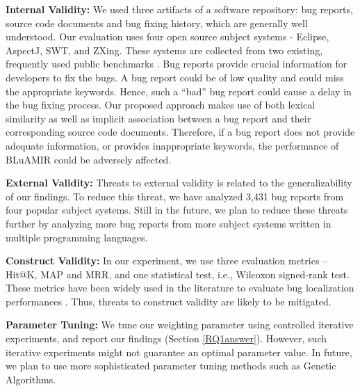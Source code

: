 \documentclass[sigconf,review,anonymous]{acmart}
\begin{document}
\textbf{Internal Validity:} We used three artifacts of a software repository: bug reports, source code documents and bug fixing history, which are generally well understood. Our evaluation uses four open source subject systems - Eclipse, AspectJ, SWT, and ZXing. These systems are collected from two existing, frequently used public benchmarks \cite{Jian, Saha}. 
Bug reports provide crucial information for developers to fix the bugs.
A bug report could be of low quality and could miss the appropriate keywords.
Hence, such a “bad” bug report could cause a delay in the bug fixing process. Our proposed approach makes use of both lexical similarity as well as implicit association between a bug report and their corresponding source code documents. Therefore, if a bug report does not provide adequate information, or provides inappropriate keywords, the performance of BLuAMIR could be adversely affected.

\textbf{External Validity:} 
Threats to external validity is related to the generalizability of our findings. 
To reduce this threat, we have analyzed 3,431 bug reports from four popular subject systems.  
Still in the future, we plan to reduce these threats further by analyzing more bug reports from more subject systems written in multiple programming languages.


\textbf{Construct Validity:}
In our experiment, we use three evaluation metrics -- Hit@K, MAP and MRR, and one statistical test, i.e., Wilcoxon signed-rank test. These metrics have been widely used in the literature to evaluate bug localization performances \cite{Jian, Saha}. Thus, threats to construct validity are likely to be mitigated.


\textbf{Parameter Tuning:}
We tune our weighting parameter using controlled iterative experiments, and report our findings (Section \ref{RQ1answer}).
However, such iterative experiments might not guarantee an optimal parameter value. In future, we plan to use more sophisticated parameter tuning methods such as Genetic Algorithms. 
\end{document}
